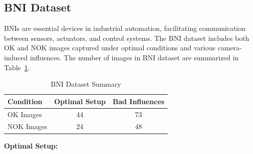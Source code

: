 \documentclass[12pt,DIV14,BCOR12mm,a4paper,footinclude=false,headinclude,parskip=half-,twoside,openright,cleardoublepage=empty,toc=index,bibliography=totoc,listof=totoc]{scrreprt}
\numberwithin{equation}{chapter}
\begin{document}
\subsection{BNI Dataset}
BNIs are essential devices in industrial automation, facilitating communication between sensors, actuators, and control systems. The BNI dataset includes both OK and NOK images captured under optimal conditions and various camera-induced influences. The number of images in BNI dataset are summarized in Table~\ref{tab:bni-dataset}.

\begin{table}
    \centering
    \caption{BNI Dataset Summary}
    \label{tab:bni-dataset}
    \begin{tabular}{lcc}
        \toprule
        \textbf{Condition} & \textbf{Optimal Setup} & \textbf{Bad Influences} \\ 
        \midrule
        OK Images          & 44                     & 73                      \\ 
        NOK Images         & 24                     & 48                      \\ 
        \bottomrule
    \end{tabular}
\end{table}


\textbf{Optimal Setup:}
\end{document}
